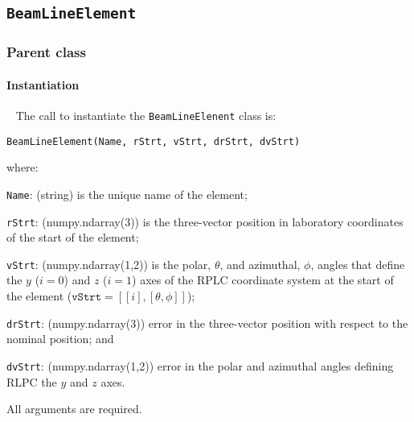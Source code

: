 \subsection{\texttt{BeamLineElement}}
\label{SubSubSect:BLE}

\subsubsection{Parent class}

\paragraph{Instantiation}   ~\newline
\noindent
The call to instantiate the \texttt{BeamLineElenent} class is:
\begin{center}
  \texttt{BeamLineElement(Name, rStrt, vStrt, drStrt, dvStrt)}
\end{center}
where:
\begin{description}
  \item\texttt{Name}: (string) is the unique name of the element;
  \item\texttt{rStrt}: (numpy.ndarray(3)) is the three-vector
    position in laboratory coordinates of the start of the element;
  \item\texttt{vStrt}: (numpy.ndarray(1,2)) is the polar, $\theta$,
    and azimuthal, $\phi$, angles that define the $y$ ($i=0$) and $z$
    ($i=1$)  axes of the RPLC coordinate system at the start of the
    element ($\texttt{vStrt}=[[i],[\theta, \phi]]$);  
  \item\texttt{drStrt}: (numpy.ndarray(3)) error in the three-vector
    position with respect to the nominal position; and
  \item\texttt{dvStrt}: (numpy.ndarray(1,2)) error in the polar and
    azimuthal angles defining RLPC the $y$ and $z$ axes.
\end{description}
All arguments are required.

